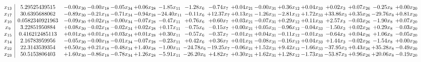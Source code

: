 \documentclass[9pt]{article}
\begin{document}
 \[\begin{array}{c| c c@{\hskip 2pt} c@{\hskip 2pt} c@{\hskip 2pt} c@{\hskip 2pt} c@{\hskip 2pt} c@{\hskip 2pt} c@{\hskip 2pt} c@{\hskip 2pt} c@{\hskip 2pt} c@{\hskip 2pt} c@{\hskip 2pt} c@{\hskip 2pt} c@{\hskip 2pt} c@{\hskip 2pt} c@{\hskip 2pt} }
 x_{13}   &  5.29525439515 & -0.00 x_{30} & -0.00 x_{18} & -0.05 x_{34} & +  0.06 x_{28} & -1.85 x_{11} & -1.28 x_{6} & -0.74 x_{7} & +  0.04 x_{21} & -0.00 x_{31} & +  0.36 x_{12} & +  0.04 x_{33} & +  0.02 x_{3} & +  0.07 x_{26} & -0.25 x_{8} & +  0.00 x_{20}\\
 x_{17}   &  30.6395688062 & -0.89 x_{30} & -0.21 x_{18} & -0.71 x_{34} & -0.94 x_{28} & -24.40 x_{11} & -0.11 x_{6} & + 12.37 x_{7} & +  0.13 x_{21} & -1.26 x_{31} & -2.81 x_{12} & +  1.72 x_{33} & + 33.86 x_{3} & +  0.35 x_{26} & -29.76 x_{8} & +  0.81 x_{20}\\
 x_{10}   &  0.0582340921963 & -0.09 x_{30} & +  0.02 x_{18} & -0.00 x_{34} & -0.07 x_{28} & -0.47 x_{11} & +  0.76 x_{6} & +  0.60 x_{7} & +  0.03 x_{21} & -0.07 x_{31} & +  0.29 x_{12} & +  0.11 x_{33} & +  2.57 x_{3} & -0.03 x_{26} & -1.90 x_{8} & +  0.07 x_{20}\\
 x_{9}   &  3.22851950884 & +  0.08 x_{30} & -0.02 x_{18} & -0.02 x_{34} & +  0.02 x_{28} & +  0.17 x_{11} & -0.75 x_{6} & -0.15 x_{7} & +  0.00 x_{21} & +  0.05 x_{31} & -0.96 x_{12} & -0.04 x_{33} & -1.50 x_{3} & +  0.02 x_{26} & +  0.29 x_{8} & -0.03 x_{20}\\
 x_{15}   &  0.416212485113 & +  0.01 x_{30} & +  0.01 x_{18} & +  0.03 x_{34} & +  0.01 x_{28} & +  0.30 x_{11} & -0.57 x_{6} & -0.37 x_{7} & -0.01 x_{21} & +  0.04 x_{31} & -0.11 x_{12} & -0.01 x_{33} & -0.64 x_{3} & +  0.04 x_{26} & +  1.06 x_{8} & -0.05 x_{20}\\
 x_{14}   &  2.16783959956 & -0.05 x_{30} & -0.00 x_{18} & -0.01 x_{34} & -0.07 x_{28} & -0.23 x_{11} & +  0.42 x_{6} & +  0.36 x_{7} & +  0.01 x_{21} & -0.08 x_{31} & -0.16 x_{12} & +  0.04 x_{33} & +  1.44 x_{3} & -0.02 x_{26} & -1.54 x_{8} & +  0.00 x_{20}\\
 x_{22}   &  22.3143539354 & +  0.50 x_{30} & +  0.21 x_{18} & -0.48 x_{34} & +  1.40 x_{28} & -1.00 x_{11} & -24.78 x_{6} & -19.25 x_{7} & -0.06 x_{21} & +  1.52 x_{31} & +  9.42 x_{12} & -1.66 x_{33} & -37.95 x_{3} & +  0.43 x_{26} & + 35.28 x_{8} & -0.49 x_{20}\\
 x_{23}   &  50.5153806403 & +  1.60 x_{30} & -0.86 x_{18} & -0.78 x_{34} & +  1.26 x_{28} & -5.91 x_{11} & -26.20 x_{6} & +  4.82 x_{7} & +  0.30 x_{21} & +  1.62 x_{31} & +  1.28 x_{12} & -1.73 x_{33} & -53.87 x_{3} & +  0.96 x_{26} & + 20.06 x_{8} & -0.19 x_{20}\\

\end{array}\]
\end{document}
